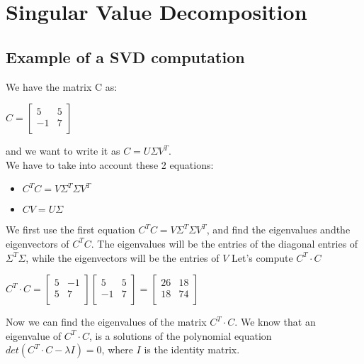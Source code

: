 \chapter{Singular Value Decomposition}
\section{Example of a SVD computation}

We have the matrix C as:
\begin{center}
	$ 
	C=\begin{bmatrix}
	5 &   5 \\
-1  &  7 \\
	\end{bmatrix}$
\end{center}
and we want to write it as $ C=U\Sigma V^{T} $.\\
We have to take into account these 2 equations:
\begin{itemize}
	\item $ C^T C = V\Sigma^T\Sigma V^T$
	\item $CV=U\Sigma$
\end{itemize}
We first use the first equation  $ C^T C = V\Sigma^T\Sigma V^T$, and find the eigenvalues andthe eigenvectors of $C^T C $.
The eigenvalues will be the entries of the diagonal entries of $ \Sigma^T\Sigma $, while the eigenvectors will be the entries of $ V $
Let's compute $ C^T \cdot C $\\
\begin{center}
	$ C^T \cdot C =\begin{bmatrix}
5 &   -1 \\
5  &  7 \\
\end{bmatrix}\begin{bmatrix}
5 &   5 \\
-1  &  7 \\
\end{bmatrix}=\begin{bmatrix}
26 &   18 \\
18  &  74 \\
\end{bmatrix}$\\
\end{center}
Now we can find the eigenvalues of the matrix $ C^T \cdot C $.
We know that an eigenvalue of $ C^T \cdot C $, is a solutions of the polynomial equation $det( C^T \cdot C-\lambda I)=0 $, where $ I $ is the identity matrix.\\
